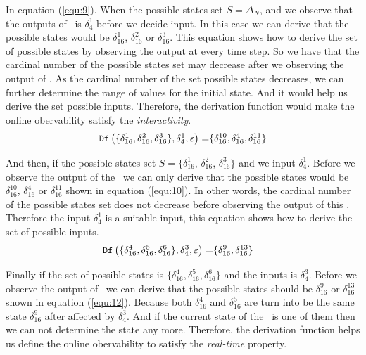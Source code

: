 In equation (\ref{equ:9}). When the possible states set $S=\Delta_N$, and  we observe that the outputs of \BCN\ is $\delta_4^1$ before we decide input. In this case we can derive that the possible states would be $\delta_{16}^1$, $\delta_{16}^2$ or  $\delta_{16}^3$. This equation shows how to derive the set of possible states by observing the output at every time step. So we have that the cardinal number of the possible states set may decrease after we observing the output of \BCN. As the cardinal number of the set possible states decreases, we can further determine the range of values for the initial state. And it would help us derive the set possible inputs. Therefore, the derivation function would make the online obervability satisfy the {\em interactivity}.
\begin{equation}
\begin{split}
{\tt Df}\left(\{\delta_{16}^1,\delta_{16}^2,\delta_{16}^3\},\delta_4^1,\varepsilon\right)=&\{\delta_{16}^{10},\delta_{16}^4,\delta_{16}^{11}\}\\
\end{split}
\label{equ:10}
\end{equation}

And then, if the possible states set $S=\{\delta_{16}^1$, $\delta_{16}^2$, $\delta_{16}^3\}$ and we input $\delta_4^1$. Before we observe the output of the \BCN\ we can only derive that the possible states would be $\delta_{16}^{10}$, $\delta_{16}^4$ or  $\delta_{16}^{11}$ shown in equation (\ref{equ:10}). In other words, the cardinal number of the possible states set does not decrease before observing the output of this \BCN. Therefore the input $\delta_4^1$ is a suitable input, this equation shows how to derive the set of possible inputs.
\begin{equation}
\begin{split}
{\tt Df}\left(\{\delta_{16}^4,\delta_{16}^5,\delta_{16}^6\},\delta_4^3,\varepsilon\right)=&\{\delta_{16}^9,\delta_{16}^{13}\}
\end{split}
\label{equ:12}
\end{equation}

 Finally if the set of possible states is $\{\delta_{16}^4,\delta_{16}^5,\delta_{16}^6\}$ and the inputs is $\delta_4^3$. Before we observe the output of \BCN\ we can derive that the possible states should be $\delta_{16}^9$ or $\delta_{16}^{13}$ shown in equation (\ref{equ:12}). Because both $\delta_{16}^4$ and $\delta_{16}^5$ are turn into be the same state $\delta_{16}^9$ after affected by $\delta_4^3$. And if the current state of the \BCN\ is one of them then we can not determine the  state any more. Therefore, the derivation function helps us define the online obervability to satisfy the {\em real-time} property. 
 
